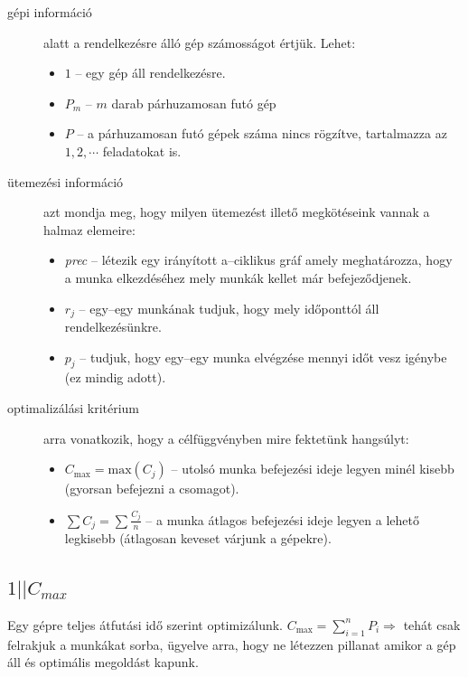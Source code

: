 \begin{description}
	\item[gépi információ] alatt a rendelkezésre álló gép számosságot értjük. Lehet:
	      \begin{itemize}
		      \item $1$ -- egy gép áll rendelkezésre.
		      \item $P_m$ -- $m$ darab párhuzamosan futó gép
		      \item $P$ -- a párhuzamosan futó gépek száma nincs rögzítve, tartalmazza az $1,2,\cdots$ feladatokat is.
	      \end{itemize}
	\item[ütemezési információ] azt mondja meg, hogy milyen ütemezést illető
	      megkötéseink vannak a halmaz elemeire:
	      \begin{itemize}
		      \item \emph{prec} -- létezik egy irányított a--ciklikus gráf amely
		            meghatározza, hogy a munka elkezdéséhez mely munkák kellet már befejeződjenek.
		      \item $r_j$ -- egy--egy munkának tudjuk, hogy mely időponttól áll rendelkezésünkre.
		      \item $p_j$ -- tudjuk, hogy egy--egy munka elvégzése mennyi időt vesz igénybe
		            (ez mindig adott).
	      \end{itemize}
	\item[optimalizálási kritérium] arra vonatkozik, hogy a célfüggvényben mire
	      fektetünk hangsúlyt:
	      \begin{itemize}
		      \item $C_{\mbox{max}}=\mbox{max}(C_j)$ -- utolsó munka befejezési ideje legyen minél
		            kisebb (gyorsan befejezni a csomagot).
		      \item $\sum C_j = \sum \frac{C_j}{n}$ -- a munka átlagos befejezési ideje
		            legyen a lehető legkisebb (átlagosan keveset várjunk a gépekre).
	      \end{itemize}
\end{description}

\subsection{ \texorpdfstring{$ 1||C_{max} $} {1||Cmax} }

Egy gépre teljes átfutási idő szerint optimizálunk. $C_{\mbox{max}}=\sum_{i=1}^{n}
	P_i \Rightarrow$ tehát csak felrakjuk a munkákat sorba, ügyelve arra, hogy ne
létezzen pillanat amikor a gép áll és optimális megoldást kapunk.

